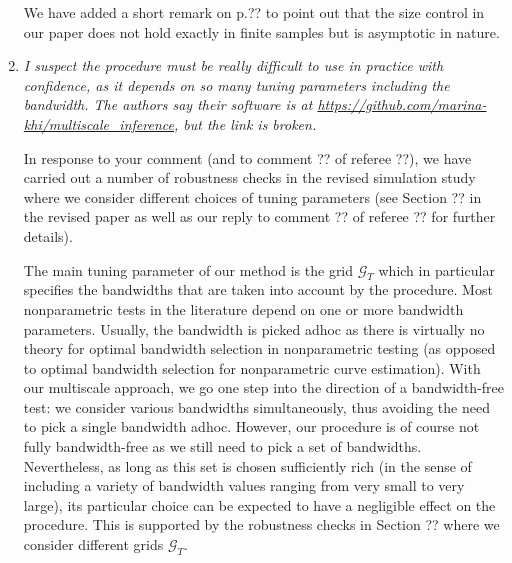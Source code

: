 \documentclass[a4paper,12pt]{article}
\begin{document}
\begin{enumerate}[label=\arabic*.,leftmargin=0.6cm]
We have added a short remark on p.?? to point out that the size control in our paper does not hold exactly in finite samples but is asymptotic in nature.   
    

\item \textit{I suspect the procedure must be really difficult to use in practice with confidence, as it depends on so many tuning parameters including the bandwidth. The authors say their software is at \url{https://github.com/marina-khi/multiscale_inference}, but the link is broken.}

In response to your comment (and to comment ?? of referee ??), we have carried out a number of robustness checks in the revised simulation study where we consider different choices of tuning parameters (see Section ?? in the revised paper as well as our reply to comment ?? of referee ?? for further details).

The main tuning parameter of our method is the grid $\mathcal{G}_T$ which in particular specifies the bandwidths that are taken into account by the procedure.
Most nonparametric tests in the literature depend on one or more bandwidth parameters. Usually, the bandwidth is picked adhoc as there is virtually no theory for optimal bandwidth selection in nonparametric testing (as opposed to optimal bandwidth selection for nonparametric curve estimation). With our multiscale approach, we go one step into the direction of a bandwidth-free test: we consider various bandwidths simultaneously, thus avoiding the need to pick a single bandwidth adhoc. However, our procedure is of course not fully bandwidth-free as we still need to pick a set of bandwidths. Nevertheless, as long as this set is chosen sufficiently rich (in the sense of including a variety of bandwidth values ranging from very small to very large), its particular choice can be expected to have a negligible effect on the procedure. This is supported by the robustness checks in Section ?? where we consider different grids $\mathcal{G}_T$. 


\end{enumerate}
\end{document}
